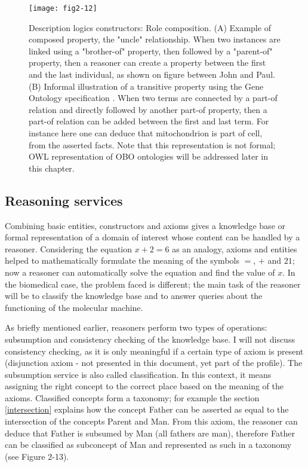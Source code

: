 \begin{figure}[ht]
    \centering
    \texttt{[image: fig2-12]}
    \caption{Description logics constructors: Role composition. (A) Example of composed property, the "uncle" relationship. When two instances are linked using a "brother-of" property, then followed by a "parent-of" property, then a reasoner can create a property between the first and the last individual, as shown on figure between John and Paul. (B) Informal illustration of a transitive property using the Gene Ontology specification \citep{gorels}. When two terms are connected by a part-of relation and directly followed by another part-of property, then a part-of relation can be added between the first and last term. For instance here one can deduce that mitochondrion is part of cell, from the asserted facts. Note that this representation is not formal; OWL representation of OBO ontologies will be addressed later in this chapter.}
    \label{fig2-12}
\end{figure}

\subsection{Reasoning services}

Combining basic entities, constructors and axioms gives a knowledge base or formal representation of a domain of interest whose content can be handled by a reasoner. Considering the equation $ x + 2 = 6 $ as an analogy, axioms and entities helped to mathematically formulate the meaning of the symbols $ = $, $ + $ and $ 21 $; now a reasoner can automatically solve the equation and find the value of $ x $. In the biomedical case, the problem faced is different; the main task of the reasoner will be to classify the knowledge base and to answer queries about the functioning of the molecular machine.

As briefly mentioned earlier, reasoners perform two types of operations: subsumption and consistency checking of the knowledge base. I will not discuss consistency checking, as it is only meaningful if a certain type of axiom is present (disjunction axiom - not presented in this document, yet part of the  profile). The subsumption service is also called classification. In this context, it means assigning the right concept to the correct place based on the meaning of the axioms. Classified concepts form a taxonomy; for example the section \ref{intersection} explains how the concept Father can be asserted as equal to the intersection of the concepts Parent and Man. From this axiom, the reasoner can deduce that Father is subsumed by Man (all fathers are man), therefore Father can be classified as subconcept of Man and represented as such in a taxonomy (see Figure 2-13).

